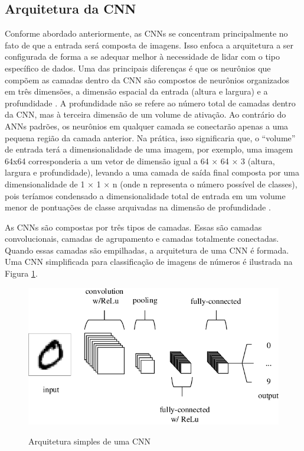 \documentclass[
	12pt,				%
	oneside,			%
	a4paper,			%
	english,			%
	brazil				%
	]{abntex2ppgsi}
\begin{document}
\subsection{Arquitetura da CNN}

Conforme abordado anteriormente, as CNNs se concentram principalmente no fato de que a entrada será composta de imagens. Isso enfoca a arquitetura a ser configurada de forma a se adequar melhor à necessidade de lidar com o tipo específico de dados. Uma das principais diferenças é que os neurônios que compõem as camadas dentro da CNN são compostos de neurônios organizados em três dimensões, a dimensão espacial da entrada (altura e largura) e a profundidade \cite{o2015introduction}. A profundidade não se refere ao número total de camadas dentro da CNN, mas à terceira dimensão de um volume de ativação. Ao contrário do ANNs padrões, os neurônios em qualquer camada se conectarão apenas a uma pequena região da camada anterior. Na prática, isso significaria que, o ``volume'' de entrada terá a dimensionalidade de uma imagem, por exemplo, uma imagem 64x64 corresponderia a um vetor de dimensão igual a 64 × 64 × 3 (altura, largura e profundidade), levando a uma camada de saída final composta por uma dimensionalidade de 1 × 1 × n (onde n representa o número possível de classes), pois teríamos condensado a dimensionalidade total de entrada em um volume menor de pontuações de classe arquivadas na dimensão de profundidade \cite{o2015introduction}.

As CNNs são compostas por três tipos de camadas. Essas são camadas convolucionais, camadas de agrupamento e camadas totalmente conectadas. Quando essas camadas são empilhadas, a arquitetura de uma CNN é formada. Uma CNN simplificada para classificação de imagens de números é ilustrada na Figura \ref{fig:arquitetura_cnn_mnist}.

\begin{figure}[H]
    \centering
    \caption{Arquitetura simples de uma CNN}
    \includegraphics[scale=.55]{imagens/arquitetura_cnn_mnist.png}
    \label{fig:arquitetura_cnn_mnist}
\end{figure}
\end{document}
